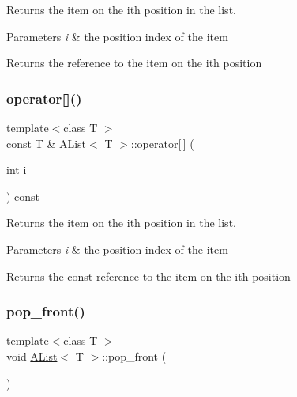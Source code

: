 Returns the item on the ith position in the list. 


\begin{DoxyParams}{Parameters}
{\em i} & the position index of the item \\
\hline
\end{DoxyParams}
\begin{DoxyReturn}{Returns}
the reference to the item on the ith position 
\end{DoxyReturn}
\mbox{\label{class_a_list_ab7dd2c5a1bef44beabc15070eb14c050}} 
\subsubsection{\texorpdfstring{operator[]()}{operator[]()}\hspace{0.1cm}{\footnotesize\ttfamily [2/2]}}
{\footnotesize\ttfamily template$<$class T $>$ \\
const T \& \mbox{\hyperlink{class_a_list}{A\+List}}$<$ T $>$\+::operator\mbox{[}$\,$\mbox{]} (\begin{DoxyParamCaption}\item[{int}]{i }\end{DoxyParamCaption}) const\hspace{0.3cm}{\ttfamily [inline]}}



Returns the item on the ith position in the list. 


\begin{DoxyParams}{Parameters}
{\em i} & the position index of the item \\
\hline
\end{DoxyParams}
\begin{DoxyReturn}{Returns}
the const reference to the item on the ith position 
\end{DoxyReturn}
\mbox{\label{class_a_list_a2240edc5f38fa7e57a868bb30b747c51}} 
\subsubsection{\texorpdfstring{pop\_front()}{pop\_front()}}
{\footnotesize\ttfamily template$<$class T $>$ \\
void \mbox{\hyperlink{class_a_list}{A\+List}}$<$ T $>$\+::pop\+\_\+front (\begin{DoxyParamCaption}{ }\end{DoxyParamCaption})}



